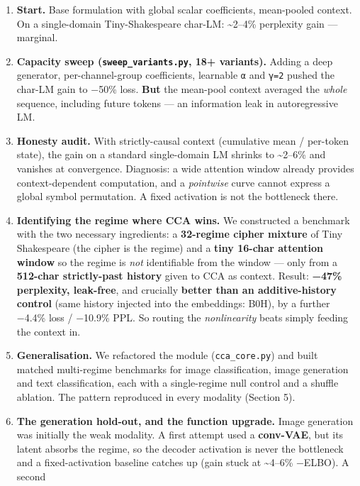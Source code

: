\documentclass[
  11pt,
]{article}
\begin{document}
\begin{enumerate}
\def\labelenumi{\arabic{enumi}.}
\item
  \textbf{Start.} Base formulation with global scalar coefficients,
  mean-pooled context. On a single-domain Tiny-Shakespeare char-LM:
  \textasciitilde2--4\% perplexity gain --- marginal.
\item
  \textbf{Capacity sweep (\texttt{sweep\_variants.py}, 18+ variants).}
  Adding a deep generator, per-channel-group coefficients, learnable
  \texttt{α} and \texttt{γ=2} pushed the char-LM gain to −50\% loss.
  \textbf{But} the mean-pool context averaged the \emph{whole} sequence,
  including future tokens --- an information leak in autoregressive LM.
\item
  \textbf{Honesty audit.} With strictly-causal context (cumulative mean
  / per-token state), the gain on a standard single-domain LM shrinks to
  \textasciitilde2--6\% and vanishes at convergence. Diagnosis: a wide
  attention window already provides context-dependent computation, and a
  \emph{pointwise} curve cannot express a global symbol permutation. A
  fixed activation is not the bottleneck there.
\item
  \textbf{Identifying the regime where CCA wins.} We constructed a
  benchmark with the two necessary ingredients: a \textbf{32-regime
  cipher mixture} of Tiny Shakespeare (the cipher is the regime) and a
  \textbf{tiny 16-char attention window} so the regime is \emph{not}
  identifiable from the window --- only from a \textbf{512-char
  strictly-past history} given to CCA as context. Result: \textbf{−47\%
  perplexity, leak-free}, and crucially \textbf{better than an
  additive-history control} (same history injected into the embeddings:
  B0H), by a further −4.4\% loss / −10.9\% PPL. So routing the
  \emph{nonlinearity} beats simply feeding the context in.
\item
  \textbf{Generalisation.} We refactored the module
  (\texttt{cca\_core.py}) and built matched multi-regime benchmarks for
  image classification, image generation and text classification, each
  with a single-regime null control and a shuffle ablation. The pattern
  reproduced in every modality (Section 5).
\item
  \textbf{The generation hold-out, and the function upgrade.} Image
  generation was initially the weak modality. A first attempt used a
  \textbf{conv-VAE}, but its latent absorbs the regime, so the decoder
  activation is never the bottleneck and a fixed-activation baseline
  catches up (gain stuck at \textasciitilde4--6\% −ELBO). A second

\end{enumerate}
\end{document}

